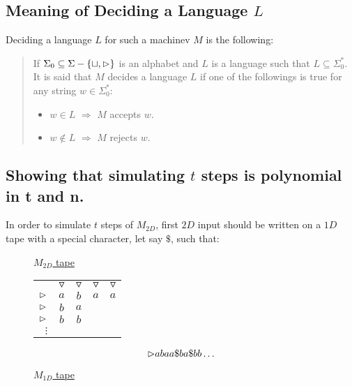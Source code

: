 \subsection*{Meaning of Deciding a Language $L$}

\noindent Deciding a language $L$ for such a machinev $M$ is the following:
\begin{quote}
  If $\Sigma_0 \subseteq \Sigma - \{ \sqcup, \vartriangleright \}$ is an alphabet and $L$ is a language such that $L \subseteq \Sigma_0^*$. It is said that $M$ decides a language $L$ if one of the followings is true for any string $w \in \Sigma_0^*$:
  \begin{itemize}
    \item $w \in L$ $\Rightarrow$ $M$ accepts $w$.
    \item $w \notin L$ $\Rightarrow$ $M$ rejects $w$.
  \end{itemize}
\end{quote}


\subsection*{Showing that simulating $t$ steps is polynomial in t and n.}

In order to simulate $t$ steps of $M_{2D}$, first $2D$ input should be written on a $1D$ tape with a special character, let say $\$$, such that:

\begin{figure}[ht]
  \centering
  \begin{minipage}{.3\linewidth}
    \centering
    \caption*{\underline{$M_{2D}$ tape}}
    \begin{tabular}{rcccc}
                & $\triangledown$ & $\triangledown$ & $\triangledown$ & $\triangledown$   \\
      $\vartriangleright$    & $a$             & $b$             & $a$             & $a$               \\
      $\vartriangleright$    & $b$             & $a$             &                 &                   \\
      $\vartriangleright$    & $b$             & $b$             &                 &                   \\
      $\vdots$  &                 &                 &                 &                   \\
    \end{tabular}
  \end{minipage}
  \begin{minipage}{.15\linewidth}
    \caption*{\underline{$M_{1D}$ tape}}
    \begin{equation*}
      {\vartriangleright}abaa\$ba\$bb\ldots
    \end{equation*}
  \end{minipage}
\end{figure}

